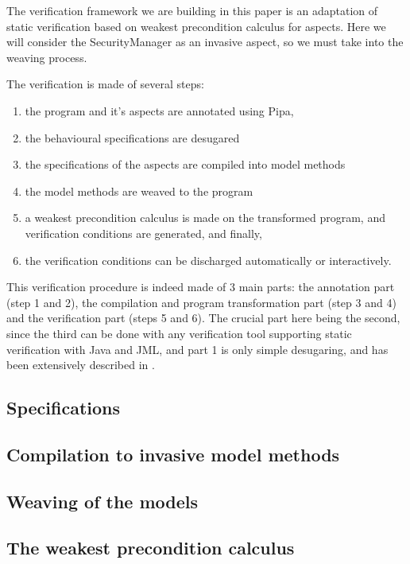 The verification framework we are building in this paper 
is an adaptation of static 
verification based on weakest precondition calculus for aspects. 
Here we will consider 
the SecurityManager as an invasive aspect, 
so we must take into the weaving process. 

The verification is made of several steps:
\begin{enumerate}
\item the program and it's aspects are annotated using Pipa,
\item the behavioural specifications are desugared
\item the specifications of the aspects are compiled into model methods
\item the model methods are weaved to the program
\item a weakest precondition calculus is made on the transformed program, and verification
conditions are generated, and finally,
\item the verification conditions can be discharged automatically or interactively.
\end{enumerate}
This verification procedure is indeed made of 3 main parts: the annotation
part (step 1 and 2), the compilation and program transformation part (step 3 and 4)
and the verification part (steps 5 and 6).
The crucial part here being the second, since the third can be done with any verification tool
supporting static verification with Java and JML, and part 1 is only simple desugaring, and has been
extensively described in \cite{RaghavanL00}.


\subsection{Specifications}


\subsection{Compilation to invasive model methods}

\subsection{Weaving of the models}


\subsection{The weakest precondition calculus}

